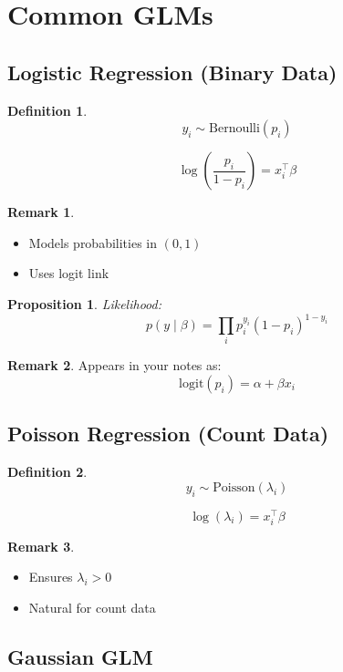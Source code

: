 \documentclass[12pt,oneside]{book}
\numberwithin{equation}{section}
\theoremstyle{definition}
\newtheorem{definition}{Definition}[section]
\newtheorem{remark}{Remark}[section]
\theoremstyle{plain}
\newtheorem{proposition}{Proposition}[section]
\theoremstyle{remark}
\begin{document}
\section{Common GLMs}

\subsection{Logistic Regression (Binary Data)}

\begin{definition}
$$
y_i \sim \text{Bernoulli}(p_i)
$$

$$
\log\left(\frac{p_i}{1 - p_i}\right)
=
x_i^\top \beta
$$
\end{definition}

\begin{remark}
\begin{itemize}
\item Models probabilities in $(0,1)$
\item Uses logit link
\end{itemize}
\end{remark}

\begin{proposition}
Likelihood:
$$
p(y \mid \beta)
=
\prod_i
p_i^{y_i}(1 - p_i)^{1 - y_i}
$$
\end{proposition}

\begin{remark}
Appears in your notes as:
$$
\text{logit}(p_i) = \alpha + \beta x_i
$$  
\end{remark}

\subsection{Poisson Regression (Count Data)}

\begin{definition}
$$
y_i \sim \text{Poisson}(\lambda_i)
$$

$$
\log(\lambda_i) = x_i^\top \beta
$$
\end{definition}

\begin{remark}
\begin{itemize}
\item Ensures $\lambda_i > 0$
\item Natural for count data
\end{itemize}
\end{remark}

\subsection{Gaussian GLM}
\end{document}
